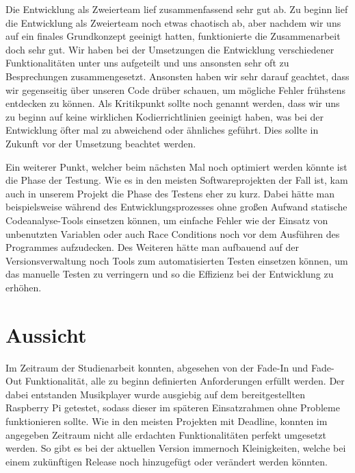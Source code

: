 Die Entwicklung als Zweierteam lief zusammenfassend sehr gut ab.
Zu beginn lief die Entwicklung als Zweierteam noch etwas chaotisch ab, aber
nachdem wir uns auf ein finales Grundkonzept geeinigt hatten, funktionierte die
Zusammenarbeit doch sehr gut. Wir haben bei der Umsetzungen die Entwicklung
verschiedener Funktionalitäten unter uns aufgeteilt und uns ansonsten sehr oft
zu Besprechungen zusammengesetzt. Ansonsten haben wir sehr darauf geachtet, dass
wir gegenseitig über unseren Code drüber schauen, um mögliche Fehler frühstens
entdecken zu können. Als Kritikpunkt sollte noch genannt werden, dass wir uns
zu beginn auf keine wirklichen Kodierrichtlinien geeinigt haben, was bei der
Entwicklung öfter mal zu abweichend  oder ähnliches
geführt. Dies sollte in Zukunft vor der Umsetzung beachtet werden. \newline

Ein weiterer Punkt, welcher beim nächsten Mal noch optimiert werden könnte ist
die Phase der Testung. Wie es in den meisten Softwareprojekten der Fall ist, %
kam auch in unserem Projekt die Phase des Testens eher zu kurz. Dabei hätte man
beispielsweise während des Entwicklungsprozesses ohne großen Aufwand statische
Codeanalyse-Tools einsetzen können, um einfache Fehler wie der Einsatz von
unbenutzten Variablen oder auch Race Conditions noch vor dem Ausführen des
Programmes aufzudecken. Des Weiteren hätte man aufbauend auf der
Versionsverwaltung noch Tools zum automatisierten Testen einsetzen können, um
das manuelle Testen zu verringern und so die Effizienz bei der Entwicklung zu
erhöhen.

\begin{comment}
- Codierrichtlinien
- Viel gelernt
- Go als Programmiersprache
- Kommunikation über Sockets zwischen zwei Programmen
- Analyse zu kurz
- Testung zu kurz
  - Countinous Integration
  - Static Code analysis
  - automatic testing with unit test
\end{comment}



\section{Aussicht}
Im Zeitraum der Studienarbeit konnten, abgesehen von der Fade-In und Fade-Out
Funktionalität, alle zu beginn definierten Anforderungen erfüllt werden. Der
dabei entstanden Musikplayer wurde ausgiebig auf dem bereitgestellten Raspberry Pi
getestet, sodass dieser im späteren Einsatzrahmen ohne Probleme funktionieren
sollte. \newline
Wie in den meisten Projekten mit Deadline, konnten im angegeben Zeitraum nicht
alle erdachten Funktionalitäten  perfekt umgesetzt werden. So gibt es bei der
aktuellen Version immernoch Kleinigkeiten, welche bei einem zukünftigen Release
noch hinzugefügt oder verändert werden könnten. \hfill \break

